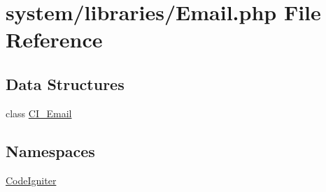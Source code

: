 \hypertarget{_email_8php}{}\section{system/libraries/\+Email.php File Reference}
\label{_email_8php}
\subsection*{Data Structures}
\begin{DoxyCompactItemize}
\item 
class \mbox{\hyperlink{class_c_i___email}{C\+I\+\_\+\+Email}}
\end{DoxyCompactItemize}
\subsection*{Namespaces}
\begin{DoxyCompactItemize}
\item 
 \mbox{\hyperlink{namespace_code_igniter}{Code\+Igniter}}
\end{DoxyCompactItemize}
